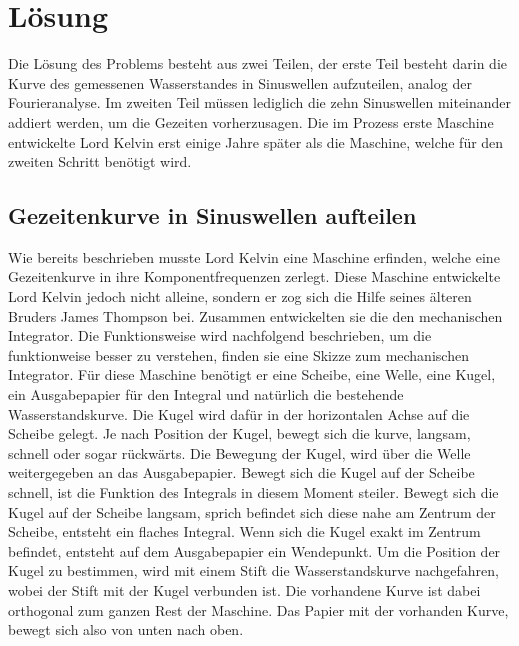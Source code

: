 %
%
%
%
\section{Lösung
	\label{gezeiten:section:Lösung}}
Die Lösung des Problems besteht aus zwei Teilen, der erste Teil besteht darin die Kurve des gemessenen Wasserstandes in Sinuswellen aufzuteilen, analog der Fourieranalyse.
Im zweiten Teil müssen lediglich die zehn Sinuswellen miteinander addiert werden, um die Gezeiten vorherzusagen.
Die im Prozess erste Maschine entwickelte Lord Kelvin erst einige Jahre später als die Maschine, welche für den zweiten Schritt benötigt wird.

\subsection{Gezeitenkurve in Sinuswellen aufteilen
	\label{gezeiten:subsection:malorum}}
Wie bereits beschrieben musste Lord Kelvin eine Maschine erfinden, welche eine Gezeitenkurve in ihre Komponentfrequenzen zerlegt.
Diese Maschine entwickelte Lord Kelvin jedoch nicht alleine, sondern er zog sich die Hilfe seines älteren Bruders James Thompson bei.
Zusammen entwickelten sie die den mechanischen Integrator.
Die Funktionsweise wird nachfolgend beschrieben, um die funktionweise besser zu verstehen, finden sie eine Skizze zum mechanischen Integrator.
Für diese Maschine benötigt er eine Scheibe, eine Welle, eine Kugel, ein Ausgabepapier für den Integral und natürlich die bestehende Wasserstandskurve.
Die Kugel wird dafür in der horizontalen Achse auf die Scheibe gelegt.
Je nach Position der Kugel, bewegt sich die kurve, langsam, schnell oder sogar rückwärts.
Die Bewegung der Kugel, wird über die Welle weitergegeben an das Ausgabepapier.
Bewegt sich die Kugel auf der Scheibe schnell, ist die Funktion des Integrals in diesem Moment steiler.
Bewegt sich die Kugel auf der Scheibe langsam, sprich befindet sich diese nahe am Zentrum der Scheibe, entsteht ein flaches Integral.
Wenn sich die Kugel exakt im Zentrum befindet, entsteht auf dem Ausgabepapier ein Wendepunkt.
Um die Position der Kugel zu bestimmen, wird mit einem Stift die Wasserstandskurve nachgefahren, wobei der Stift mit der Kugel verbunden ist.
Die vorhandene Kurve ist dabei orthogonal zum ganzen Rest der Maschine.
Das Papier mit der vorhanden Kurve, bewegt sich also von unten nach oben.

